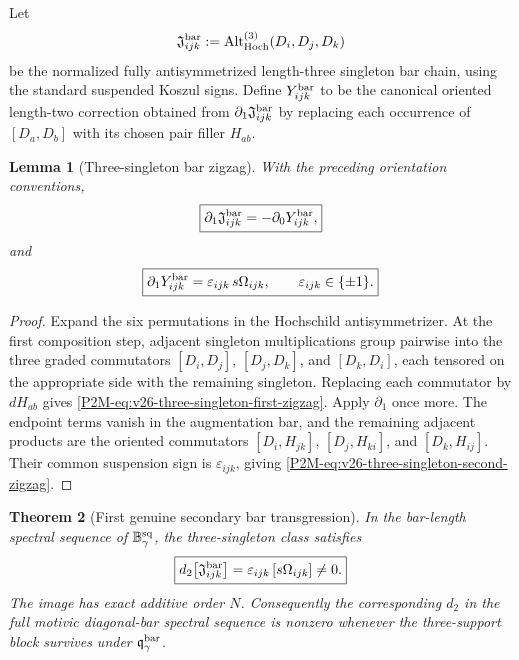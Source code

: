 \documentclass[11pt]{article}
\newtheorem{theorem}{Theorem}[section]
\newtheorem{lemma}[theorem]{Lemma}
\theoremstyle{remark}
\begin{document}
Let
\[
 \mathfrak J_{ijk}^{\rm bar}
 :=
 \operatorname{Alt}^{(3)}_{\rm Hoch}(D_i,D_j,D_k)
\]
be the normalized fully antisymmetrized length-three singleton bar chain,
using the standard suspended Koszul signs.  Define
\(Y_{ijk}^{\rm bar}\) to be the canonical oriented length-two correction
obtained from
\(\partial_1\mathfrak J_{ijk}^{\rm bar}\) by replacing each occurrence of
\([D_a,D_b]\) with its chosen pair filler \(H_{ab}\).

\begin{lemma}[Three-singleton bar zigzag]
\label{P2M-lem:v26-three-singleton-zigzag}
With the preceding orientation conventions,
\begin{equation}\label{P2M-eq:v26-three-singleton-first-zigzag}
 \boxed{
 \partial_1\mathfrak J_{ijk}^{\rm bar}
 =
 -\partial_0Y_{ijk}^{\rm bar},}
\end{equation}
and
\begin{equation}\label{P2M-eq:v26-three-singleton-second-zigzag}
 \boxed{
 \partial_1Y_{ijk}^{\rm bar}
 =
 \varepsilon_{ijk}\,
 s\Omega_{ijk},
 \qquad
 \varepsilon_{ijk}\in\{\pm1\}.}
\end{equation}
\end{lemma}

\begin{proof}
Expand the six permutations in the Hochschild antisymmetrizer.
At the first composition step, adjacent singleton multiplications group
pairwise into the three graded commutators
\([D_i,D_j]\), \([D_j,D_k]\), and \([D_k,D_i]\), each tensored on the
appropriate side with the remaining singleton.  Replacing each commutator by
\(dH_{ab}\) gives
\eqref{P2M-eq:v26-three-singleton-first-zigzag}.
Apply \(\partial_1\) once more.  The endpoint terms vanish in the augmentation
bar, and the remaining adjacent products are the oriented commutators
\([D_i,H_{jk}]\), \([D_j,H_{ki}]\), and \([D_k,H_{ij}]\).
Their common suspension sign is \(\varepsilon_{ijk}\), giving
\eqref{P2M-eq:v26-three-singleton-second-zigzag}.
\end{proof}

\begin{theorem}[First genuine secondary bar transgression]
\label{P2M-thm:v26-first-secondary-bar-transgression}
In the bar-length spectral sequence of
\(\mathbb B_\gamma^{\rm sq}\), the three-singleton class satisfies
\begin{equation}
 \boxed{
 d_2
 \bigl[
   \mathfrak J_{ijk}^{\rm bar}
 \bigr]
 =
 \varepsilon_{ijk}\,
 [s\Omega_{ijk}]
 \ne0.}
\end{equation}
The image has exact additive order \(N\).
Consequently the corresponding \(d_2\) in the full motivic diagonal-bar
spectral sequence is nonzero whenever the three-support block survives under
\(\mathfrak q_\gamma^{\rm bar}\).
\end{theorem}
\end{document}
